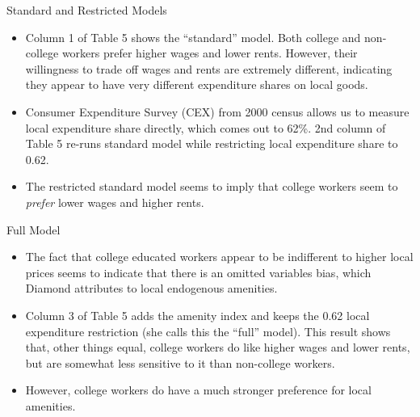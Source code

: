 \documentclass[aspectratio=169]{beamer}
\begin{document}

\begin{frame}{Standard and Restricted Models}

\begin{itemize}
    \item<1-> Column 1 of Table 5 shows the ``standard” model.  Both college and non-college workers prefer higher wages and lower rents. However, their willingness to trade off wages and rents are extremely different, indicating they appear to have very different expenditure shares on local goods.
    \item<2-> Consumer Expenditure Survey (CEX) from 2000 census allows us to measure local expenditure share directly, which comes out to 62\%.  2nd column of Table 5 re-runs standard model while restricting local expenditure share to 0.62.
    \item<3-> The restricted standard model seems to imply that college workers seem to \emph{prefer} lower wages and higher rents.  
\end{itemize}
    
\end{frame}


\begin{frame}{Full Model}

\begin{itemize}
    \item<1-> The fact that college educated workers appear to be indifferent to higher local prices seems to indicate that there is an omitted variables bias, which Diamond attributes to local endogenous amenities.
    \item<2-> Column 3 of Table 5 adds the amenity index and keeps the 0.62 local expenditure restriction (she calls this the ``full” model).  This result shows that, other things equal, college workers do like higher wages and lower rents, but are somewhat less sensitive to it than non-college workers.
    \item<3-> However, college workers do have a much stronger preference for local amenities.
\end{itemize}
    
\end{frame}

\end{document}
